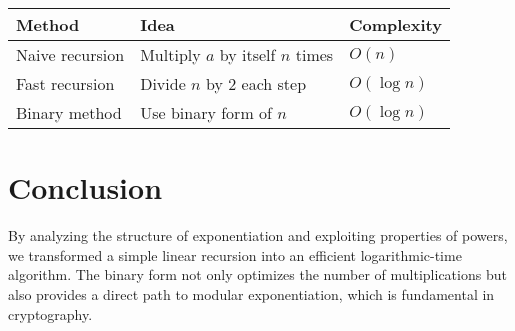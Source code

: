 \documentclass[a4paper,12pt]{article}
\begin{document}
\begin{center}
    \begin{tabular}{|l|l|l|}
        \hline
        \textbf{Method} & \textbf{Idea} & \textbf{Complexity} \\
        \hline
        Naive recursion & Multiply $a$ by itself $n$ times & $O(n)$ \\
        Fast recursion & Divide $n$ by 2 each step & $O(\log n)$ \\
        Binary method & Use binary form of $n$ & $O(\log n)$ \\
        \hline
    \end{tabular}
\end{center}

\section{Conclusion}

By analyzing the structure of exponentiation and exploiting properties of powers,
we transformed a simple linear recursion into an efficient logarithmic-time algorithm.
The binary form not only optimizes the number of multiplications but also
provides a direct path to modular exponentiation, which is fundamental in cryptography.
\end{document}
